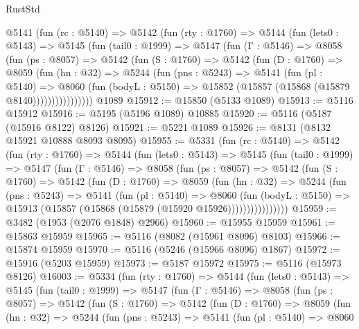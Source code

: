 \begin{lexlean}{RustStd}
\begin{coremodule}
    @5141
      (fun (rc : @5140) =>
      @5142
        (fun (rty : @1760) =>
        @5144
          (fun (lets0 : @5143) =>
          @5145
            (fun (tail0 : @1999) =>
            @5147
              (fun (Γ : @5146) =>
              @8058
                (fun (ps : @8057) =>
                @5142
                  (fun (S : @1760) =>
                  @5142
                    (fun (D : @1760) =>
                    @8059
                      (fun (hn : @32) =>
                      @5244
                        (fun (pns : @5243) =>
                        @5141
                          (fun (pl : @5140) =>
                          @8060
                            (fun (bodyL : @5150) =>
                            @15852 (@15857 (@15868 (@15879 @8140))))))))))))))))
    @1089
@15912 := @15850 (@5133 @1089)
@15913 := @5116 @15912
@15916 := @5195 (@5196 @1089) @10885
@15920 := @5116 (@5187 (@15916 @8122) @8126)
@15921 := @5221 @1089
@15926 := @8131 (@8132 @15921 @10888 @8093 @8095)
@15955 := @5331
    (fun (rc : @5140) =>
    @5142
      (fun (rty : @1760) =>
      @5144
        (fun (lets0 : @5143) =>
        @5145
          (fun (tail0 : @1999) =>
          @5147
            (fun (Γ : @5146) =>
            @8058
              (fun (ps : @8057) =>
              @5142
                (fun (S : @1760) =>
                @5142
                  (fun (D : @1760) =>
                  @8059
                    (fun (hn : @32) =>
                    @5244
                      (fun (pns : @5243) =>
                      @5141
                        (fun (pl : @5140) =>
                        @8060
                          (fun (bodyL : @5150) =>
                          @15913 (@15857 (@15868 (@15879 (@15920 @15926))))))))))))))))
@15959 := @3482 (@1953 (@2076 @1848) @2966)
@15960 := @15955 @15959
@15961 := @15863 @15959
@15965 := @5116 (@8082 (@15961 @8096) @8103)
@15966 := @15874 @15959
@15970 := @5116 (@5246 (@15966 @8096) @1867)
@15972 := @15916 (@5203 @15959)
@15973 := @5187 @15972
@15975 := @5116 (@15973 @8126)
@16003 := @5334
    (fun (rty : @1760) =>
    @5144
      (fun (lets0 : @5143) =>
      @5145
        (fun (tail0 : @1999) =>
        @5147
          (fun (Γ : @5146) =>
          @8058
            (fun (ps : @8057) =>
            @5142
              (fun (S : @1760) =>
              @5142
                (fun (D : @1760) =>
                @8059
                  (fun (hn : @32) =>
                  @5244
                    (fun (pns : @5243) =>
                    @5141
                      (fun (pl : @5140) =>
                      @8060

\end{coremodule}
\end{lexlean}
